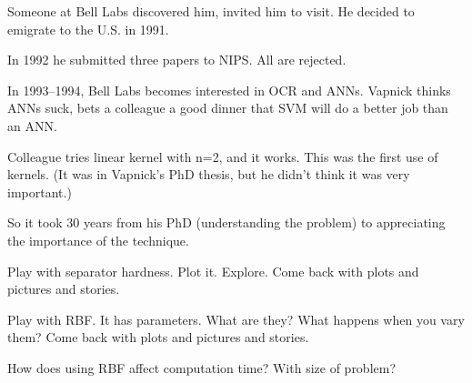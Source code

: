 Someone at Bell Labs discovered him, invited him to visit.  He decided
to emigrate to the U.S. in 1991.

In 1992 he submitted three papers to NIPS.  All are rejected.

In 1993--1994, Bell Labs becomes interested in OCR and ANNs.  Vapnick
thinks ANNs suck, bets a colleague a good dinner that SVM will do a
better job than an ANN.

Colleague tries linear kernel with n=2, and it works.  This was the
first use of kernels.  (It was in Vapnick's PhD thesis, but he didn't
think it was very important.)

So it took 30 years from his PhD (understanding the problem) to
appreciating the importance of the technique.



Play with separator hardness.  Plot it.  Explore.  Come back with
plots and pictures and stories.

Play with RBF.  It has parameters.  What are they?  What happens when
you vary them?  Come back with plots and pictures and stories.

How does using RBF affect computation time?  With size of problem?



